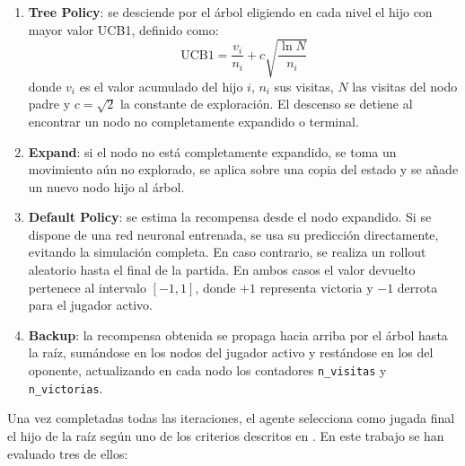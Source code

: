 \documentclass[conference,a4paper]{IEEEtran}
\begin{document}
\begin{enumerate}
  \item \textbf{Tree Policy}: se desciende por el árbol
  eligiendo en cada nivel el hijo con mayor valor UCB1, definido como:
  \begin{equation}
    \text{UCB1} = \frac{v_i}{n_i} + c \sqrt{\frac{\ln N}{n_i}}
    \label{eq:ucb1}
  \end{equation}
  donde $v_i$ es el valor acumulado del hijo $i$, $n_i$ sus visitas, $N$ las
  visitas del nodo padre y $c = \sqrt{2}$ la constante de exploración. El
  descenso se detiene al encontrar un nodo no completamente expandido o terminal.

  \item \textbf{Expand}: si el nodo no está completamente expandido, se toma
  un movimiento aún no explorado, se aplica sobre una copia del estado y se
  añade un nuevo nodo hijo al árbol.

  \item \textbf{Default Policy}: se estima la recompensa desde el nodo expandido. Si se dispone de una red neuronal entrenada, se usa su predicción directamente, evitando la simulación completa. En caso contrario, se realiza un rollout aleatorio hasta el final de la partida. En ambos casos el valor devuelto pertenece al intervalo $[-1, 1]$, donde $+1$ representa victoria y $-1$ derrota para el jugador activo.

  \item \textbf{Backup}: la recompensa obtenida se
  propaga hacia arriba por el árbol hasta la raíz, sumándose en los nodos del jugador activo y restándose en los del oponente, actualizando en cada nodo los contadores \texttt{n\_visitas} y \texttt{n\_victorias}.
  
\end{enumerate}

Una vez completadas todas las iteraciones, el agente selecciona como jugada
final el hijo de la raíz según uno de los criterios descritos en \cite{b2}.
En este trabajo se han evaluado tres de ellos:
\end{document}
